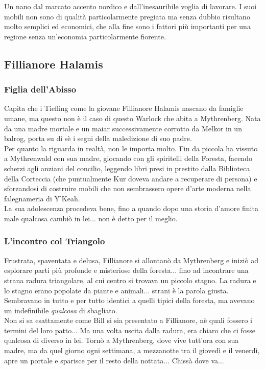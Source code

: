 Un nano dal marcato accento nordico e dall'inesauribile voglia di lavorare. I suoi mobili non sono di qualità particolarmente pregiata ma senza dubbio risultano molto semplici ed economici, che alla fine sono i fattori più importanti per una regione senza un'economia particolarmente fiorente.

\subsection{Fillianore Halamis}

\subsubsection{Figlia dell'Abisso}

Capita che i Tiefling come la giovane Fillianore Halamis nascano da famiglie umane, ma questo non è il caso di questo Warlock che abita a Mythrenberg. Nata da una madre mortale e un maiar successivamente corrotto da Melkor in un balrog, porta su di sè i segni della maledizione di suo padre. \\ Per quanto la riguarda in realtà, non le importa molto. Fin da piccola ha vissuto a Mythrenwald con sua madre, giocando con gli spiritelli della Foresta, facendo scherzi agli anziani del concilio, leggendo libri presi in prestito dalla Biblioteca della Corteccia (che puntualmente Kur doveva andare a recuperare di persona) e sforzandosi di costruire mobili che non sembrassero opere d'arte moderna nella falegnameria di Y'Keah. \\ La sua adolescenza procedeva bene, fino a quando dopo una storia d'amore finita male qualcosa cambiò in lei... non è detto per il meglio.

\subsubsection{L'incontro col Triangolo}

Frustrata, spaventata e delusa, Fillianore si allontanò da Mythrenberg e iniziò ad esplorare parti più profonde e misteriose della foresta... fino ad incontrare una strana radura triangolare, al cui centro si trovava un piccolo stagno. La radura e lo stagno erano popolate da piante e animali... strani è la parola giusta. Sembravano in tutto e per tutto identici a quelli tipici della foresta, ma avevano un indefinibile \textit{qualcosa} di sbagliato. \\ Non si sa esattamente come Bill si sia presentato a Fillianore, nè quali fossero i termini del loro patto... Ma una volta uscita dalla radura, era chiaro che ci fosse qualcosa di diverso in lei. Tornò a Mythrenberg, dove vive tutt'ora con sua madre, ma da quel giorno ogni settimana, a mezzanotte tra il giovedì e il venerdì, apre un portale e sparisce per il resto della nottata... Chissà dove va...